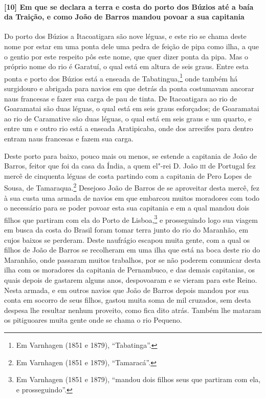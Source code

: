 \paragraph{[10] Em que se declara a terra e costa do porto dos Búzios até a baía da Traição,
e como João de Barros mandou povoar a sua capitania} \quad
Do porto dos Búzios a Itacoatigara são nove léguas, e este rio se chama deste nome por
estar em uma ponta dele uma pedra de feição de pipa como ilha, a que o gentio por este
respeito pôs este nome, que quer dizer ponta da pipa. Mas o próprio nome do rio é Garatuí,
o qual está em altura de seis graus. Entre esta ponta e porto dos Búzios está a enseada de
Tabatingua,\footnote{ Em Varnhagen (1851 e 1879), ``Tabatinga''.} onde também há
surgidouro e abrigada para navios em que detrás da ponta costumavam ancorar naus francesas
e fazer sua carga de pau de tinta. De Itacoatigara ao rio de Goaramatai são duas léguas, o
qual está em seis graus esforçados; de Goaramatai ao rio de Caramative são duas léguas, o
qual está em seis graus e um quarto, e entre um e outro rio está a enseada Aratipicaba,
onde dos arrecifes para dentro entram naus francesas e fazem sua carga.

Deste porto para baixo, pouco mais ou menos, se estende a capitania de João de Barros,
feitor que foi da casa da Índia, a quem el"-rei D. João \textsc{iii} de Portugal fez mercê
de cinquenta léguas de costa partindo com a capitania de Pero Lopes de Sousa, de
Tamaraqua.\footnote{ Em Varnhagen (1851 e 1879), ``Tamaracá''.} Desejoso João de Barros de
se aproveitar desta mercê, fez à sua custa uma armada de navios em que embarcou muitos
moradores com todo o necessário para se poder povoar esta sua capitania e em a qual mandou
dois filhos que partiram com ela do Porto de Lisboa,\footnote{ Em Varnhagen (1851 e 1879),
``mandou dois filhos seus que partiram com ela, e prosseguindo''.} e prosseguindo logo sua
viagem em busca da costa do Brasil foram tomar terra junto do rio do Maranhão, em cujos
baixos se perderam. Deste naufrágio escapou muita gente, com a qual os filhos de João de
Barros se recolheram em uma ilha que está na boca deste rio do Maranhão, onde passaram
muitos trabalhos, por se não poderem comunicar desta ilha com os moradores da capitania de
Pernambuco, e das demais capitanias, os quais depois de gastarem alguns anos, despovoaram
e se vieram para este Reino. Nesta armada, e em outros navios que João de Barros depois
mandou por sua conta em socorro de seus filhos, gastou muita soma de mil cruzados, sem
desta despesa lhe resultar nenhum proveito, como fica dito atrás. Também lhe mataram os
pitiguoares muita gente onde se chama o rio Pequeno.

